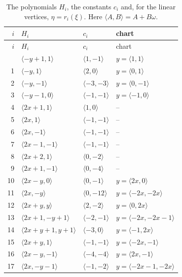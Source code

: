 \documentclass[11pt]{article}
\begin{document}
\clearpage
\begingroup\small
\setlength{\LTcapwidth}{\textwidth}
\begin{longtable}{@{}rlll@{}}
\caption{The polynomials $H_i$, the constants $c_i$ and, for the linear vertices, $\eta=r_i(\xi)$. Here $\langle A,B\rangle=A+B\omega$.}\label{tab:vert1}\\
\hline $i$ & $H_i$ & $c_i$ & chart\\\hline\endfirsthead\hline $i$ & $H_i$ & $c_i$ & chart\\\hline\endhead\hline\endfoot
0 & $\langle -y+1,1\rangle$ & $\langle 1,-1\rangle$ & $y=\langle 1,1\rangle$\\
1 & $\langle -y,1\rangle$ & $\langle 2,0\rangle$ & $y=\langle 0,1\rangle$\\
2 & $\langle -y,-1\rangle$ & $\langle -3,-3\rangle$ & $y=\langle 0,-1\rangle$\\
3 & $\langle -y-1,0\rangle$ & $\langle -1,-1\rangle$ & $y=\langle -1,0\rangle$\\
4 & $\langle 2x+1,1\rangle$ & $\langle 1,0\rangle$ & --\\
5 & $\langle 2x,1\rangle$ & $\langle -1,-1\rangle$ & --\\
6 & $\langle 2x,-1\rangle$ & $\langle -1,-1\rangle$ & --\\
7 & $\langle 2x-1,-1\rangle$ & $\langle -1,-1\rangle$ & --\\
8 & $\langle 2x+2,1\rangle$ & $\langle 0,-2\rangle$ & --\\
9 & $\langle 2x+1,-1\rangle$ & $\langle 0,-4\rangle$ & --\\
10 & $\langle 2x-y,0\rangle$ & $\langle 0,-1\rangle$ & $y=\langle 2x,0\rangle$\\
11 & $\langle 2x,-y\rangle$ & $\langle 0,-12\rangle$ & $y=\langle -2x,-2x\rangle$\\
12 & $\langle 2x+y,y\rangle$ & $\langle 2,-2\rangle$ & $y=\langle 0,2x\rangle$\\
13 & $\langle 2x+1,-y+1\rangle$ & $\langle -2,-1\rangle$ & $y=\langle -2x,-2x-1\rangle$\\
14 & $\langle 2x+y+1,y+1\rangle$ & $\langle -3,0\rangle$ & $y=\langle -1,2x\rangle$\\
15 & $\langle 2x+y,1\rangle$ & $\langle -1,-1\rangle$ & $y=\langle -2x,-1\rangle$\\
16 & $\langle 2x-y,-1\rangle$ & $\langle -4,-4\rangle$ & $y=\langle 2x,-1\rangle$\\
17 & $\langle 2x,-y-1\rangle$ & $\langle -1,-2\rangle$ & $y=\langle -2x-1,-2x\rangle$\\

\end{longtable}
\end{document}
